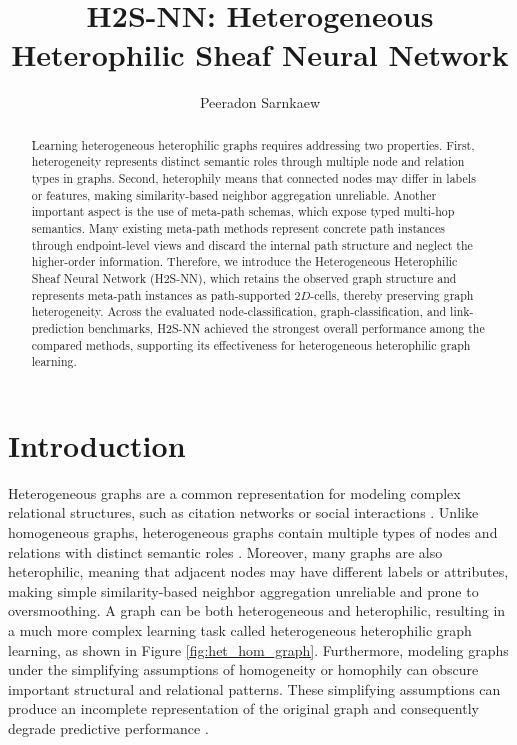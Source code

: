 \documentclass[sigconf,anonymous,review]{acmart}
\title[H2S-NN]{H2S-NN: Heterogeneous Heterophilic Sheaf Neural Network}
\author{Peeradon Sarnkaew}
\affiliation{%
  \institution{Independent Researcher}
  \city{Bangkok}
  \country{Thailand}
}
\newcommand{\method}{\textsc{H2S-NN}}
\begin{document}
\begin{abstract}
Learning heterogeneous heterophilic graphs requires addressing two properties. First, heterogeneity represents distinct semantic roles through multiple node and relation types in graphs. Second, heterophily means that connected nodes may differ in labels or features, making similarity-based neighbor aggregation unreliable. Another important aspect is the use of meta-path schemas, which expose typed multi-hop semantics. Many existing meta-path methods represent concrete path instances through endpoint-level views and discard the internal path structure and neglect the higher-order information. Therefore, we introduce the Heterogeneous Heterophilic Sheaf Neural Network (\method{}), which retains the observed graph structure and represents meta-path instances as path-supported \(2D\)-cells, thereby preserving graph heterogeneity. Across the evaluated node-classification, graph-classification, and link-prediction benchmarks, \method{} achieved the strongest overall performance among the compared methods, supporting its effectiveness for heterogeneous heterophilic graph learning.
\end{abstract}



\maketitle

\section{Introduction}
\label{sec:introduction}


Heterogeneous graphs are a common representation for modeling complex relational structures, such as citation 
networks \cite{liu2014meta} or social interactions \cite{singh2025overview}. Unlike homogeneous graphs, heterogeneous graphs contain multiple types of nodes and relations with distinct semantic roles \cite{sun2013mining}. Moreover, many graphs are also heterophilic, meaning that adjacent nodes may have different labels or attributes, making simple similarity-based neighbor aggregation unreliable and prone to oversmoothing. A graph can be both heterogeneous and heterophilic, resulting in a much more complex learning task called heterogeneous heterophilic graph learning, as shown in Figure \ref{fig:het_hom_graph}. Furthermore, modeling graphs under the simplifying assumptions of homogeneity or homophily can obscure important structural and relational patterns. These simplifying assumptions can produce an incomplete representation of the original graph and consequently degrade predictive performance \cite{lin2025heterophily}. 
\end{document}

